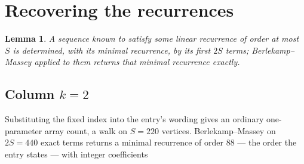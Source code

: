 \documentclass[11pt,a4paper]{article}
\theoremstyle{plain}
\newtheorem{lemma}[theorem]{Lemma}
\theoremstyle{definition}
\begin{document}
\section{Recovering the recurrences}

\begin{lemma}\label{lem:bm}
A sequence known to satisfy some linear recurrence of order at most $S$ is determined, with its
minimal recurrence, by its first $2S$ terms; Berlekamp--Massey applied to them returns that
minimal recurrence exactly.
\end{lemma}

\subsection*{Column $k=2$}
Substituting the fixed index into the entry's wording gives an ordinary one-parameter array
count, a walk on $S=220$ vertices. Berlekamp--Massey on $2S=440$ exact terms
returns a minimal recurrence of order $88$ --- the order the entry states --- with
integer coefficients
\end{document}
